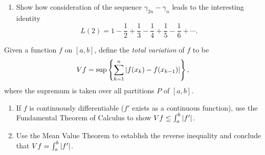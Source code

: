 \begin{problem}
\begin{enumerate}[label=(\alph*)]
    \item Show how consideration of the sequence $\gamma_{2n} - \gamma_{n}$ leads to the
      interesting identity
      \[
        L(2) = 1 - \frac{1}{2} + \frac{1}{3} - \frac{1}{4} + \frac{1}{5} - \frac{1}{6} + \cdots.
      \]
  \end{enumerate}
\end{problem}

\begin{problem}
  \label{prob:total-variation}
  Given a function $f$ on $[a, b]$, define the \textit{total variation} of $f$ to be
  \[
    Vf = \sup \left\{ \sum_{k=1}^{n} \left\lvert f(x_{k}) - f(x_{k-1}) \right\rvert \right\},
  \]
  where the supremum is taken over all partitions $P$ of $[a, b]$.
  \begin{enumerate}[label=(\alph*)]
    \item If $f$ is continuously differentiable ($f'$ exists as a continuous function),
      use the Fundamental Theorem of Calculus to show $Vf \leq \int_{a}^{b} \left\lvert f' \right\rvert$.

    \item Use the Mean Value Theorem to establish the reverse inequality and conclude
      that $Vf = \int_{a}^{b} \left\lvert f' \right\rvert$.
  \end{enumerate}
\end{problem}
